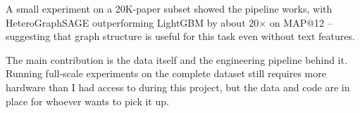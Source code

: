\documentclass{article}
\begin{document}
A small experiment on a 20K-paper subset showed the pipeline works, with HeteroGraphSAGE outperforming LightGBM by about 20$\times$ on MAP@12 -- suggesting that graph structure is useful for this task even without text features.

The main contribution is the data itself and the engineering pipeline behind it.
Running full-scale experiments on the complete dataset still requires more hardware than I had access to during this project, but the data and code are in place for whoever wants to pick it up.



\end{document}
